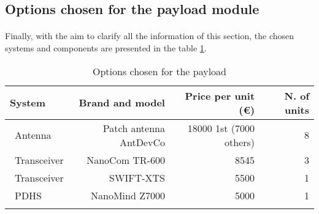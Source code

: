 \subsection{Options chosen for the payload module}

\paragraph{}Finally, with the aim to clarify all the information of this section, the chosen systems and components are presented in the table \ref{payloadchosen}.

\begin{longtable}{| l | r | r | r |}
	\hline
	\rowcolor[gray]{0.80}	\textbf{System} &  \textbf{Brand and model}     & \textbf{Price per unit (\euro)} & \textbf{N. of units}  \\
	\hline
	\endfirsthead
	
	~Antenna & Patch antenna AntDevCo & 18000 1st (7000 others) & 8 \\
	~Transceiver & NanoCom TR-600 & 8545 & 3 \\
	~Transceiver & SWIFT-XTS & 5500 &1\\
	~PDHS & NanoMind Z7000 & 5000 & 1 \\
	\hline
	
\caption{Options chosen for the payload}
\label{payloadchosen}
\end{longtable}

